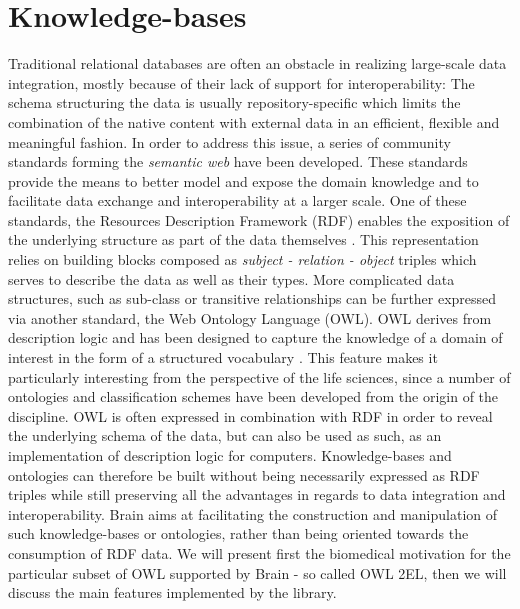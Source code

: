 \documentclass{bioinfo}
\begin{document}
\section{Knowledge-bases}
Traditional relational databases are often an obstacle in realizing large-scale data integration,
mostly because of their lack of support for
interoperability: The schema structuring the data is usually repository-specific which limits the combination of the
native content with external data in an efficient, flexible and meaningful fashion.
In order to address this issue,
a series of community standards forming the \emph{semantic web} have been developed. These standards provide the means to better model
and expose the domain knowledge and to facilitate data exchange and interoperability at a larger scale.
One of these standards, the Resources Description
Framework (RDF) enables the exposition of the underlying structure as part of the data themselves \citep{FrankManola}.
This representation relies on building blocks composed as
\emph{subject - relation - object} triples which serves to describe the data as well as their types.
More complicated data structures, such as sub-class or
transitive relationships can be further expressed via another standard, the Web Ontology Language (OWL). OWL derives from description logic and
has been designed to capture the knowledge of a domain of interest in the form of a structured vocabulary \citep{W3COWLWorkingGroup}.
This feature makes it particularly
interesting from the perspective of the life sciences, since a number of ontologies and classification schemes
have been developed from the origin of
the discipline. OWL is often expressed in combination with RDF in order to reveal the underlying schema of the data, but
can also be used as such, as an implementation of description logic for computers.
Knowledge-bases and ontologies can therefore be built without being necessarily expressed as RDF triples while still preserving all the
advantages in regards to data integration and interoperability.
Brain aims at facilitating the construction and manipulation of
such knowledge-bases or ontologies, rather than being oriented towards the consumption of RDF data.
We will present first the biomedical motivation for the particular subset of OWL supported by Brain - so called OWL 2EL,
then we will discuss the main features implemented by the library.
\end{document}
